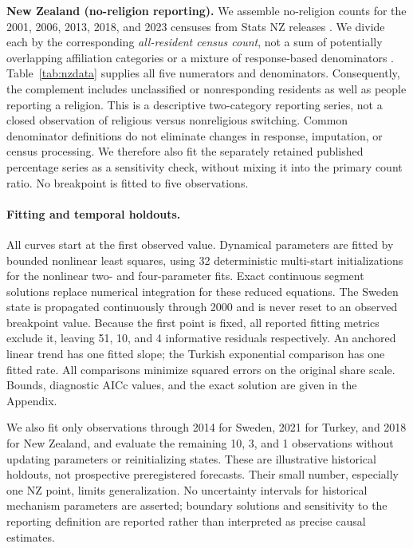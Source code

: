 \textbf{New Zealand (no-religion reporting).}
We assemble no-religion counts for the 2001, 2006, 2013, 2018, and 2023 censuses from Stats NZ releases \cite{statsnz2019religion,statsnz2024religion}. We divide each by the corresponding \emph{all-resident census count}, not a sum of potentially overlapping affiliation categories or a mixture of response-based denominators \cite{teara2001population,statsnz2013population,statsnz2018population,statsnz2024religion}. Table~\ref{tab:nzdata} supplies all five numerators and denominators. Consequently, the complement includes unclassified or nonresponding residents as well as people reporting a religion. This is a descriptive two-category reporting series, not a closed observation of religious versus nonreligious switching. Common denominator definitions do not eliminate changes in response, imputation, or census processing. We therefore also fit the separately retained published percentage series as a sensitivity check, without mixing it into the primary count ratio. No breakpoint is fitted to five observations.

\paragraph{Fitting and temporal holdouts.}
All curves start at the first observed value. Dynamical parameters are fitted by bounded nonlinear least squares, using 32 deterministic multi-start initializations for the nonlinear two- and four-parameter fits. Exact continuous segment solutions replace numerical integration for these reduced equations. The Sweden state is propagated continuously through 2000 and is never reset to an observed breakpoint value. Because the first point is fixed, all reported fitting metrics exclude it, leaving 51, 10, and 4 informative residuals respectively. An anchored linear trend has one fitted slope; the Turkish exponential comparison has one fitted rate. All comparisons minimize squared errors on the original share scale. Bounds, diagnostic AICc values, and the exact solution are given in the Appendix.

We also fit only observations through 2014 for Sweden, 2021 for Turkey, and 2018 for New Zealand, and evaluate the remaining 10, 3, and 1 observations without updating parameters or reinitializing states. These are illustrative historical holdouts, not prospective preregistered forecasts. Their small number, especially one NZ point, limits generalization. No uncertainty intervals for historical mechanism parameters are asserted; boundary solutions and sensitivity to the reporting definition are reported rather than interpreted as precise causal estimates.

